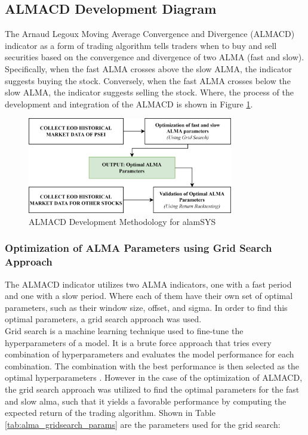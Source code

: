\subsection{ALMACD Development Diagram}
\label{subsec:almacd_diagram}
The Arnaud Legoux Moving Average Convergence and Divergence (ALMACD) 
indicator as a form of trading algorithm tells traders when to buy and sell securities 
based on the convergence and divergence of two ALMA (fast and slow). 
Specifically, when the fast ALMA crosses above the slow ALMA, the indicator 
suggests buying the stock. Conversely, when the fast ALMA crosses below 
the slow ALMA, the indicator suggests selling the stock. Where, the process 
of the development and integration of the ALMACD
is shown in Figure \ref{fig:almacd_diagram}.

\begin{figure}[ht]
    \centering
    \includegraphics[width=0.80\textwidth]{./assets/Chapter_3/alamcd.png}
    \caption{ALMACD Development Methodology for alamSYS}
    \label{fig:almacd_diagram}
\end{figure}
\FloatBarrier

\subsubsection{Optimization of ALMA Parameters using Grid Search Approach}
\label{subsubsec:almacd_gridsearch}
The ALMACD indicator utilizes two ALMA indicators, one with a fast
period and one with a slow period. Where each of them have their own
set of optimal parameters, such as their window size, offset, and sigma.
In order to find this optimal parameters, a grid search approach was
used.
\hfill \\

Grid search is a machine learning technique used to fine-tune the
hyperparameters of a model. It is a brute force approach that tries
every combination of hyperparameters and evaluates the model performance
for each combination. The combination with the best performance is
then selected as the optimal hyperparameters \cite{Joseph2018}.
However in the case of the optimization of ALMACD, the grid search
approach was utilized to find the optimal parameters for the 
fast and slow alma, such that it yields a favorable performance
by computing the expected return of the trading algorithm. Shown in Table
\ref{tab:alma_gridsearch_params} are the parameters used for the grid search:

